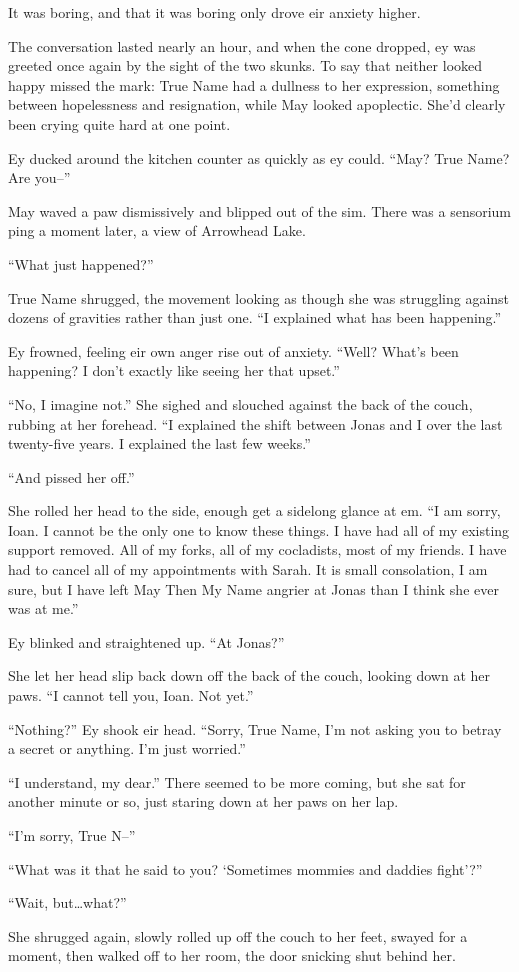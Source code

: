 It was boring, and that it was boring only drove eir anxiety higher.

The conversation lasted nearly an hour, and when the cone dropped, ey was greeted once again by the sight of the two skunks. To say that neither looked happy missed the mark: True Name had a dullness to her expression, something between hopelessness and resignation, while May looked apoplectic. She'd clearly been crying quite hard at one point.

Ey ducked around the kitchen counter as quickly as ey could. ``May? True Name? Are you--''

May waved a paw dismissively and blipped out of the sim. There was a sensorium ping a moment later, a view of Arrowhead Lake.

``What just happened?''

True Name shrugged, the movement looking as though she was struggling against dozens of gravities rather than just one. ``I explained what has been happening.''

Ey frowned, feeling eir own anger rise out of anxiety. ``Well? What's been happening? I don't exactly like seeing her that upset.''

``No, I imagine not.'' She sighed and slouched against the back of the couch, rubbing at her forehead. ``I explained the shift between Jonas and I over the last twenty-five years. I explained the last few weeks.''

``And pissed her off.''

She rolled her head to the side, enough get a sidelong glance at em. ``I am sorry, Ioan. I cannot be the only one to know these things. I have had all of my existing support removed. All of my forks, all of my cocladists, most of my friends. I have had to cancel all of my appointments with Sarah. It is small consolation, I am sure, but I have left May Then My Name angrier at Jonas than I think she ever was at me.''

Ey blinked and straightened up. ``At Jonas?''

She let her head slip back down off the back of the couch, looking down at her paws. ``I cannot tell you, Ioan. Not yet.''

``Nothing?'' Ey shook eir head. ``Sorry, True Name, I'm not asking you to betray a secret or anything. I'm just worried.''

``I understand, my dear.'' There seemed to be more coming, but she sat for another minute or so, just staring down at her paws on her lap.

``I'm sorry, True N--''

``What was it that he said to you? `Sometimes mommies and daddies fight'?''

``Wait, but\ldots what?''

She shrugged again, slowly rolled up off the couch to her feet, swayed for a moment, then walked off to her room, the door snicking shut behind her.

